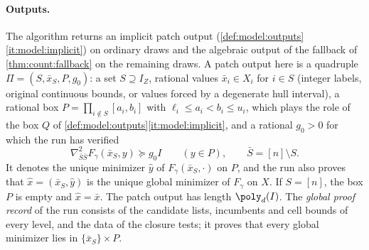 \paragraph{Outputs.}
The algorithm returns an implicit patch output
(\cref{def:model:outputs}\ref{it:model:implicit}) on ordinary draws and the
algebraic output of the fallback of \cref{thm:count:fallback} on the
remaining draws. A patch output here is a quadruple $\Pi=(S,\bar x_S,P,g_0)$:
a set $S\supseteq I_Z$, rational values $\bar x_i\in X_i$ for $i\in S$
(integer labels, original continuous bounds, or values forced by a degenerate
hull interval), a rational box $P=\prod_{i\notin S}[a_i,b_i]$ with
$\ell_i\le a_i<b_i\le u_i$, which plays the role of the box $Q$ of
\cref{def:model:outputs}\ref{it:model:implicit}, and a rational $g_0>0$ for
which the run has verified
\begin{equation}\label{eq:sp:patch}
 \nabla^2_{\bar S\bar S}F_\gamma(\bar x_S,y)\succeq g_0I
 \qquad(y\in P),\qquad\bar S=[n]\setminus S.
\end{equation}
It denotes the unique minimizer $\hat y$ of $F_\gamma(\bar x_S,\cdot)$ on $P$,
and the run also proves that $\hat x=(\bar x_S,\hat y)$ is the unique global
minimizer of $F_\gamma$ on $X$. If $S=[n]$, the box $P$ is empty and
$\hat x=\bar x$. The patch output has length $\poly_d(I)$. The \emph{global
proof record} of the run consists of the candidate lists, incumbents and
cell bounds of every level, and the data of the closure tests; it proves
that every global minimizer lies in $\{\bar x_S\}\times P$.


